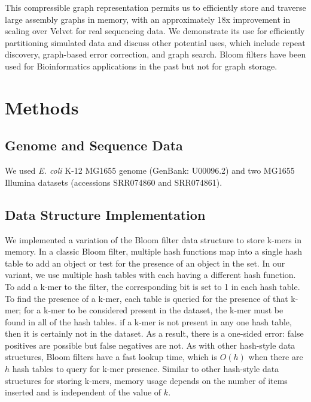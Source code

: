 \documentclass[12pt]{article} \usepackage{simplemargins}
\begin{document}
This compressible graph representation permits us to efficiently store
and traverse large assembly graphs in memory, with an approximately
18x improvement in scaling over Velvet for real sequencing data.  We
demonstrate its use for efficiently partitioning simulated data and
discuss other potential uses, which include repeat discovery,
graph-based error correction, and graph search.  Bloom filters have
been used for Bioinformatics applications in the
past\cite{pmid20472541, haskell, pmid20426693} but not for graph
storage.

\section{Methods}

\subsection{Genome and Sequence Data}
We used \emph{E. coli} K-12 MG1655 genome (GenBank: U00096.2) and two MG1655 Illumina 
datasets (accessions SRR074860 and SRR074861). 

\subsection{Data Structure Implementation}
We implemented a variation of the Bloom filter data structure to store k-mers
in memory. In a classic Bloom filter, multiple hash functions map into 
a single hash table to add an object or test for the presence of an object 
in the set. In 
our variant, we use multiple hash tables with each having a different hash function. 
To add a k-mer to the filter, the corresponding bit is set to 1 
in each hash table.  
To find the presence of a k-mer, each table is queried for the
presence of that k-mer; for a k-mer to be considered 
present in the dataset, 
the k-mer must be found in all of the hash tables.  
if a k-mer is not present in any one hash table, then it is certainly 
not in the dataset. As a result, there is a one-sided error:  
false positives are possible but false negatives are not. As with other 
hash-style data structures, Bloom filters have a
fast lookup time, which is $O(h)$ when there are $h$ hash tables to query
for k-mer presence. Similar to other hash-style data structures for 
storing k-mers, memory usage depends on the number of items inserted 
and is independent of the value of $k$. 
\end{document}
